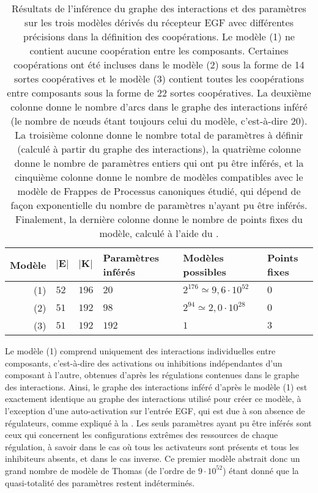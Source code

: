 \begin{table}[ht]
  \ZifferAn
  \begin{center}
  \begin{tabular}{r|l|l|l|l|l} %
    \textbf{Modèle} & $\mathbf{|E|}$ & $\mathbf{|K|}$ & \textbf{Paramètres inférés} &
      \textbf{Modèles possibles} & \textbf{Points fixes}
  \\\hline\hline
    (1) & $52$ & $196$ & $20$ & $2^{176}\simeq 9,6\cdot10^{52}$ & $0$   %
  \\\hline
    (2) & $51$ & $192$ & $98$ & $2^{94}\simeq 2,0\cdot10^{28}$ & $0$    %
  \\\hline
    (3) & $51$ & $192$ & $192$ & $1$ & $3$                              %
  \\\hline
  \end{tabular}
  \end{center}
  \caption{%
    Résultats de l'inférence du graphe des interactions et des paramètres
    sur les trois modèles dérivés du récepteur EGF %
    avec différentes précisions dans la définition des coopérations.
    Le modèle (1) ne contient aucune coopération entre les composants.
    Certaines coopérations ont été incluses dans le modèle (2) sous la forme de 14
    sortes coopératives et le modèle (3) contient toutes les coopérations entre composants
    sous la forme de 22 sortes coopératives.
    La deuxième colonne donne le nombre d'arcs dans le graphe des interactions inféré
    (le nombre de nœuds étant toujours celui du modèle, c'est-à-dire 20).
    La troisième colonne donne le nombre total de paramètres à définir
    (calculé à partir du graphe des interactions),
    la quatrième colonne donne le nombre de paramètres entiers qui ont pu être inférés,
    et la cinquième colonne donne le nombre de modèles compatibles avec le modèle
    de Frappes de Processus canoniques étudié,
    qui dépend de façon exponentielle du nombre de paramètres n'ayant pu être inférés.
    Finalement, la dernière colonne donne le nombre de points fixes du modèle,
    calculé à l'aide du .
  }
  \ZifferAus
\end{table}


Le modèle (1) comprend uniquement des interactions individuelles entre composants,
c'est-à-dire des activations ou inhibitions indépendantes d'un composant à l'autre,
obtenues d'après les régulations contenues dans le graphe des interactions.
Ainsi, le graphe des interactions inféré d'après le modèle (1) est exactement identique
au graphe des interactions utilisé pour créer ce modèle,
à l'exception d'une auto-activation sur l'entrée EGF,
qui est due à son absence de régulateurs,
comme expliqué à la .
Les seuls paramètres ayant pu être inférés sont ceux qui concernent les configurations extrêmes
des ressources de chaque régulation,
à savoir dans le cas où tous les activateurs sont présents et tous les inhibiteurs absents,
et dans le cas inverse.
Ce premier modèle abstrait donc un grand nombre de modèle de Thomas
(de l'ordre de $9\cdot10^{52}$)
étant donné que la quasi-totalité des paramètres restent indéterminés.

